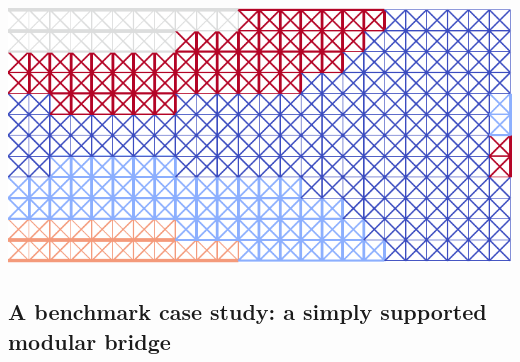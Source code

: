\begin{figure}
    \hfill
    \caption{}
    \label{fig:06}
\end{figure}

\begin{marginfigure}
    \centering
    \includegraphics[width=\linewidth]{figures/06_DMO/00_optimized_modules/VL/nt=5VL.pdf}
    \caption{}
    \label{fig:06}
\end{marginfigure}

\subsection{A benchmark case study: a simply supported modular bridge}

